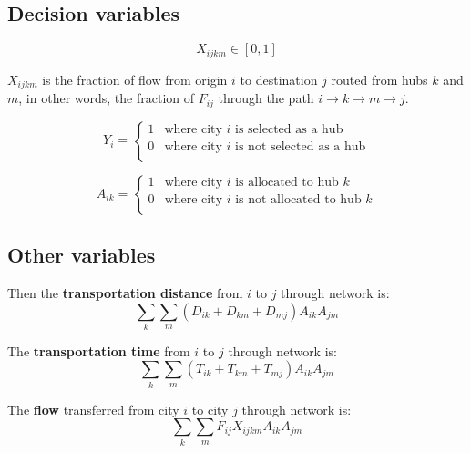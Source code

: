 \documentclass{llncs}
\begin{document}
	\subsection{Decision variables}
	
	\begin{equation}
	X_{ijkm} \in [0,1]
	\end{equation}
	
	$X_{ijkm}$ is the fraction of flow from origin $i$ to destination $j$ routed from hubs $k$ and $m$, in other words, the fraction of $F_{ij}$ through the path $i \rightarrow k \rightarrow m\rightarrow j$.
	
	\begin{equation}\label{}
	Y_{i} = 
	\left\{  
	\begin{array}{ll}  
	1 & \text{where city $i$ is selected as a hub} \\  
	0 &  \text{where city $i$ is not selected as a hub}\\      
	\end{array}  
	\right.  
	\end{equation}
	
	\begin{equation}\label{}
	A_{ik} = 
	\left\{  
	\begin{array}{ll}  
	1 & \text{where city $i$ is allocated to hub $k$} \\  
	0 &  \text{where city $i$ is not allocated to hub $k$}\\      
	\end{array}  
	\right.  
	\end{equation}
	
\subsection{Other variables}
	
	Then the \textbf{transportation distance} from $i$ to $j$ through network is:
	\begin{equation}
	\sum_{k}\sum_{m}{(D_{ik} + D_{km}+ D_{mj}) A_{ik} A_{jm}}
	\end{equation}
	
	The \textbf{transportation time} from $i$ to $j$ through network is:
	\begin{equation}
	\sum_{k}\sum_{m}{(T_{ik}+ T_{km}+ T_{mj} ) A_{ik} A_{jm}}
	\end{equation}
	
	The \textbf{flow} transferred from city $i$ to city $j$ through network is:
	\begin{equation}
	\sum_{k}\sum_{m}{F_{ij} X_{ijkm} A_{ik} A_{jm}}
	\end{equation}
	
\end{document}
